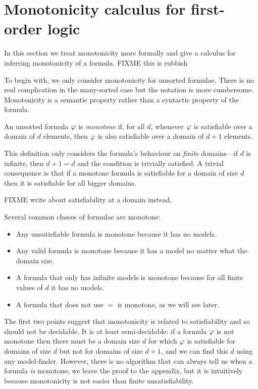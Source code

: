 \section{Monotonicity calculus for first-order logic}



\label{sec_monotonicity}

In this section we treat monotonicity more formally and give a
calculus for inferring monotonicity of a formula. FIXME this is
rubbish

To begin with, we only consider monotonicity for unsorted formulae.
There is no real complication in the many-sorted case but the notation
is more cumbersome. Monotonicity is a semantic property rather than a
syntactic property of the formula.
\begin{definition}
An unsorted formula $\varphi$ is \emph{monotone} if, for all $d$,
whenever $\varphi$ is satisfiable over a domain of $d$ elements,
then $\varphi$ is also satisfiable over a domain of $d+1$ elements.
\end{definition}

This definition only considers the formula's behaviour on
\emph{finite} domains---if $d$ is infinite, then $d+1 = d$ and the
condition is trivially satisfied. A trivial consequence is that if a
monotone formula is satisfiable for a domain of size $d$ then it is
satisfiable for all bigger domains.

FIXME write about satisfiability at a domain instead.

Several common classes of formulae are monotone:
\begin{itemize}
\item Any unsatisfiable formula is monotone because it has no models.
\item Any valid formula is monotone because it has a model no matter
  what the domain size.
\item A formula that only has infinite models is monotone because for
  all finite values of $d$ it has no models.
\item A formula that does not use $=$ is monotone, as we will see
  later.
\end{itemize}

The first two points suggest that monotonicity is related to
satisfiability and so should not be decidable. It is at least
semi-decidable: if a formula $\varphi$ is not monotone then there
must be a domain size $d$ for which $\varphi$ is satisfiable for
domains of size $d$ but not for domains of size $d+1$, and we can find
this $d$ using any model-finder. However, there is no algorithm that
can always tell us when a formula \emph{is} monotone; we leave the
proof to the appendix, but it is intuitively because monotonicity is
not easier than finite unsatisfiability.

